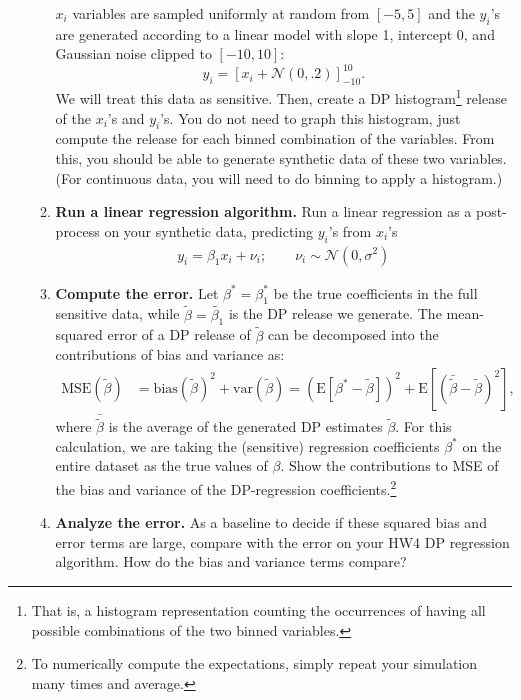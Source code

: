 \documentclass[11pt]{article}
\begin{document}
\begin{enumerate}[leftmargin=*]
\begin{enumerate}
            $x_i$ variables are sampled uniformly at random from $[-5,5]$ and the
            $y_i$'s
            are generated according to a linear model with slope 1, intercept 0, and Gaussian noise clipped to $[-10,10]$:
            $$y_i = \left[x_i + \mathcal{N}(0,.2)\right]_{-10}^{10}.$$
            We will treat this data as sensitive. Then,
            create a DP
            histogram\footnote{That is, a histogram representation counting the occurrences of having all possible combinations of the
            two binned variables.} release of the $x_i$'s and $y_i$'s.
            You do not need to graph this histogram, just compute the release for each binned combination of the variables.  From this, you should be able to generate synthetic data of these two
            variables. (For continuous data, you will need to do binning to apply a histogram.)
            \item \textbf{Run a linear regression algorithm.} Run a linear regression as a post-process on your synthetic data, predicting $y_i$'s from $x_i$'s
            \begin{align}
                y_i =  \beta_1 x_i
                + \nu_i; \qquad \nu_i \sim \mathcal{N}(0, \sigma^2) \label{eq:ydist}
            \end{align}
            \item \textbf{Compute the error.}
            Let $\beta^*=\beta_1^*$
            be the true coefficients in the full sensitive data, while  $\tilde{\beta}=\tilde{\beta_1}$ is the DP release we generate. The mean-squared error of a DP release of $\tilde{\beta}$ can be decomposed into the contributions of bias and variance as:
            \begin{align}
                \textrm{MSE}(\tilde{\beta}) &= \textrm{bias}(\tilde{\beta})^2 + \textrm{var}(\tilde{\beta})  =  (\textrm{E}[ \beta^* - \tilde{\beta}])^2 +    \textrm{E}[(\bar{\tilde{\beta}} - \tilde{\beta})^2] ,
            \end{align}
            where $\bar{\tilde{\beta}}$ is the average of the generated
            DP estimates $\tilde\beta$.
            For this calculation, we are taking the (sensitive) regression coefficients $\beta^*$ on the entire dataset as the true values of $\beta$. Show the contributions to MSE of the bias and variance of the DP-regression coefficients.\footnote{To numerically compute the expectations, simply repeat your simulation many times and average.}
            \item \textbf{Analyze the error.} As a baseline to decide if these squared bias and error terms are large, compare with the error on your HW4 DP regression algorithm. How do the bias and variance terms compare?
        \end{enumerate}



\end{enumerate}
\end{document}
